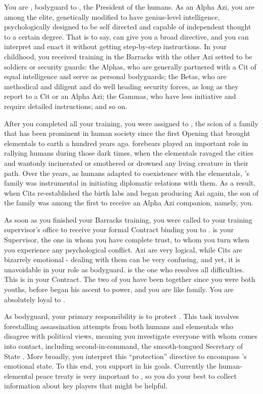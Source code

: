 \documentclass[char]{elementals}
\begin{document}
\name{\cRomeo{}}

You are \cRomeo{\intro}, bodyguard to \cLeader{\intro}, the President of the humans.  As an Alpha Azi, you are among the elite, genetically modified to have genius-level intelligence, psychologically designed to be self directed and capable of independent thought to a certain degree.  That is to say, \cLeader{} can give you a broad directive, and you can interpret and enact it without getting step-by-step instructions.  In your childhood, you received training in the Barracks with the other Azi setted to be soldiers or security guards: the Alphas, who are generally partnered with a Cit of equal intelligence and serve as personal bodyguards; the Betas, who are methodical and diligent and do well heading security forces, as long as they report to a Cit or an Alpha Azi; the Gammas, who have less initiative and require detailed instructions; and so on.

After you completed all your training, you were assigned to \cLeader{}, the scion of a family that has been prominent in human society since the first Opening that brought elementals to earth a hundred years ago.  \cLeader{\Their} forebears played an important role in rallying humans during those dark times, when the elementals ravaged the cities and wantonly incinerated or smothered or drowned any living creature in their path.  Over the years, as humans adapted to coexistence with the elementals, \cLeader{}'s family was instrumental in initiating diplomatic relations with them.  As a result, when Cits re-established the birth labs and began producing Azi again, the son of the \cLeader{\formal} family was among the first to receive an Alpha Azi companion, namely, you.

As soon as you finished your Barracks training, you were called to your training supervisor's office to receive your formal Contract binding you to \cLeader{}.  \cLeader{\They} is your Supervisor, the one in whom you have complete trust, to whom you turn when you experience any psychological conflict.  Azi are very logical, while Cits are bizarrely emotional - dealing with them can be very confusing, and yet, it is unavoidable in your role as bodyguard.  \cLeader{} is the one who resolves all difficulties.  This is in your Contract.  The two of you have been together since you were both youths, before \cLeader{\they} began his ascent to power, and you are like family.  You are absolutely loyal to \cLeader{\them}.

As \cLeader{\their} bodyguard, your primary responsibility is to protect \cLeader{\them}.  This task involves forestalling assassination attempts from both humans and elementals who disagree with \cLeader{\their} political views, meaning you investigate everyone with whom \cLeader{\they} comes into contact, including \cLeader{\their} second-in-command, the smooth-tongued Secretary of State \cDema{\intro}.  More broadly, you interpret this ``protection'' directive to encompass \cLeader{}'s emotional state.  To this end, you support \cLeader{\them} in his goals.  Currently the human-elemental peace treaty is very important to \cLeader{\them}, so you do your best to collect information about key players that might be helpful.
\end{document}
